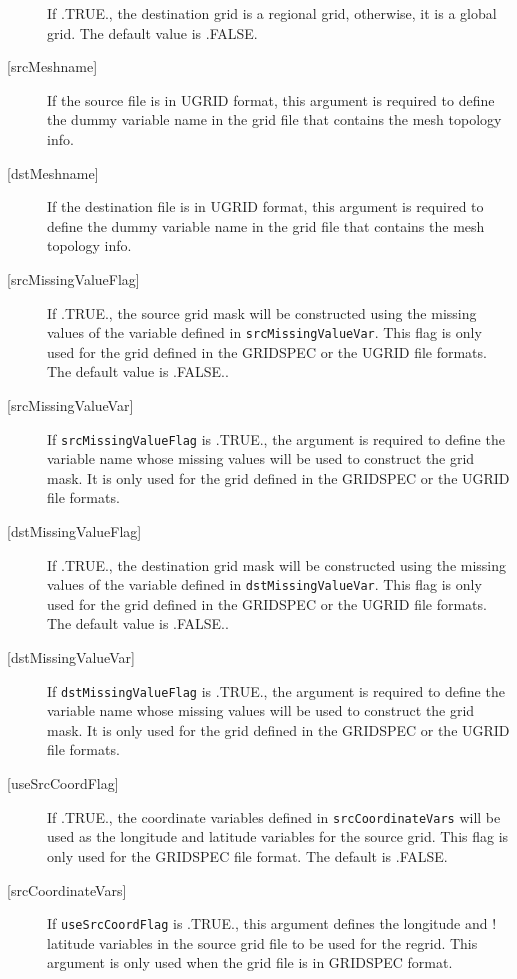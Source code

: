 \begin{description}
       If .TRUE., the destination grid is a regional grid, otherwise,
       it is a global grid.  The default value is .FALSE.
     \item [{[srcMeshname]}]
       If the source file is in UGRID format, this argument is required
       to define the dummy variable name in the grid file that contains the
       mesh topology info.
     \item [{[dstMeshname]}]
       If the destination file is in UGRID format, this argument is required
       to define the dummy variable name in the grid file that contains the
       mesh topology info.
     \item [{[srcMissingValueFlag]}]
       If .TRUE., the source grid mask will be constructed using the missing
       values of the variable defined in {\tt srcMissingValueVar}. This flag is
       only used for the grid defined in  the GRIDSPEC or the UGRID file formats.
       The default value is .FALSE..
     \item [{[srcMissingValueVar]}]
       If {\tt srcMissingValueFlag} is .TRUE., the argument is required to define
       the variable name whose missing values will be used to construct the grid
       mask.  It is only used for the grid defined in  the GRIDSPEC or the UGRID
       file formats.
     \item [{[dstMissingValueFlag]}]
       If .TRUE., the destination grid mask will be constructed using the missing
       values of the variable defined in {\tt dstMissingValueVar}. This flag is
       only used for the grid defined in  the GRIDSPEC or the UGRID file formats.
       The default value is .FALSE..
     \item [{[dstMissingValueVar]}]
       If {\tt dstMissingValueFlag} is .TRUE., the argument is required to define
       the variable name whose missing values will be used to construct the grid
       mask.  It is only used for the grid defined in  the GRIDSPEC or the UGRID
       file formats.
     \item [{[useSrcCoordFlag]}]
       If .TRUE., the coordinate variables defined in {\tt srcCoordinateVars} will
       be used as the longitude and latitude variables for the source grid.
       This flag is only used for the GRIDSPEC file format.  The default is .FALSE.
     \item [{[srcCoordinateVars]}]
       If {\tt useSrcCoordFlag} is .TRUE., this argument defines the longitude and
  !     latitude variables in the source grid file to be used for the regrid.
       This argument is only used when the grid file is in GRIDSPEC format.

\end{description}
